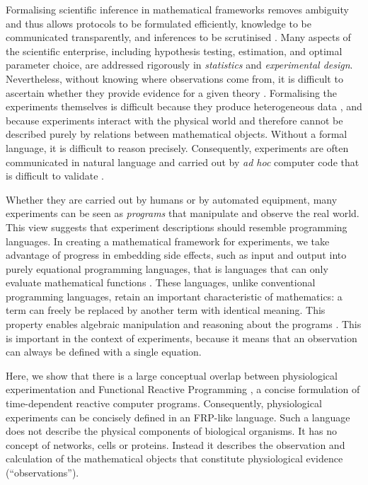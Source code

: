 Formalising scientific inference in mathematical frameworks removes
ambiguity and thus allows protocols to be formulated efficiently,
knowledge to be communicated transparently, and inferences to be
scrutinised \citep{Soldatova2006, Jaynes2003, Krantz1971}. Many
aspects of the scientific enterprise, including hypothesis testing,
estimation, and optimal parameter choice, are addressed rigorously in
\emph{statistics} and \emph{experimental design}. Nevertheless,
without knowing where observations come from, it is difficult to
ascertain whether they provide evidence for a given theory
\citep{Pool2002,MacKenzie-Graham2008,VanHorn2009}. Formalising the
experiments themselves is difficult because they produce heterogeneous
data \citep{Tukey1962}, and because experiments interact with the
physical world and therefore cannot be described purely by relations
between mathematical objects. Without a formal language, it is
difficult to reason precisely. Consequently, experiments are often
communicated in natural language and carried out by \emph{ad hoc}
computer code that is difficult to validate \citep{Baggerly2009, Merali2010}. 

Whether they are carried out by humans or by automated equipment, many
experiments can be seen as \emph{programs} that manipulate and observe
the real world. This view suggests that experiment descriptions should
resemble programming languages. In creating a mathematical framework
for experiments, we take advantage of progress in embedding side
effects, such as input and output \citep{PeytonJones2002, Roy2004,
  Wadler1995} into purely equational programming languages, that is
languages that can only evaluate mathematical functions
\citep{Church1941}. These languages, unlike conventional programming
languages, retain an important characteristic of mathematics: a term
can freely be replaced by another term with identical meaning.
This property \citep[referential transparency;][]{Whitehead1927} enables
algebraic manipulation and reasoning about the programs
\citep{Bird1996}. This is important in the context of experiments,
because it means that an observation can always be defined with a
single equation.

Here, we show that there is a large conceptual overlap between
physiological experimentation and Functional Reactive Programming
\citep[FRP;][]{Elliott1997, Nilsson2002}, a concise formulation of
time-dependent reactive computer programs. Consequently, physiological
experiments can be concisely defined in an FRP-like language. Such a
language does not describe the physical components of biological
organisms. It has no concept of networks, cells or proteins. Instead
it describes the observation and calculation of the mathematical
objects that constitute physiological evidence (``observations'').

